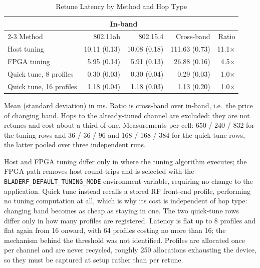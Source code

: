 \begin{table}[!t]
  \renewcommand{\arraystretch}{1.2}
  \caption{Retune Latency by Method and Hop Type}
  \label{tab:retune-latency}
  \centering
  \small
  \begin{tabular}{lrrrr}
    \toprule
    & \multicolumn{2}{c}{In-band} & & \\
    \cmidrule(lr){2-3}
    Method & 802.11ah & 802.15.4 & Cross-band & Ratio \\
    \midrule
    Host tuning            & 10.11 (0.13) & 10.08 (0.18) & 111.63 (0.73) & 11.1$\times$ \\
    FPGA tuning            &  5.95 (0.14) &  5.91 (0.13) &  26.88 (0.16) &  4.5$\times$ \\
    Quick tune, 8 profiles &  0.30 (0.03) &  0.30 (0.04) &   0.29 (0.03) &  1.0$\times$ \\
    Quick tune, 16 profiles &  1.18 (0.04) &  1.18 (0.03) &   1.13 (0.20) &  1.0$\times$ \\
    \bottomrule
  \end{tabular}
  \par\vspace{2pt}
  \parbox{\linewidth}{\footnotesize Mean (standard deviation) in ms. Ratio is
  cross-band over in-band, i.e.\ the price of changing band. Hops to the
  already-tuned channel are excluded: they are not retunes and cost about a
  third of one. Measurements per cell: 650 / 240 / 832 for the tuning rows and
  36 / 36 / 96 and 168 / 168 / 384 for the quick-tune rows, the latter pooled
  over three independent runs.

  Host and FPGA tuning differ only in where the tuning algorithm executes; the
  FPGA path removes host round-trips and is selected with the
  \texttt{BLADERF\_DEFAULT\_TUNING\_MODE} environment variable, requiring no
  change to the application. Quick tune instead recalls a stored RF front-end
  profile, performing no tuning computation at all, which is why its cost is
  independent of hop type: changing band becomes as cheap as staying in one.
  The two quick-tune rows differ only in how many profiles are registered.
  Latency is flat up to 8 profiles and flat again from 16 onward, with 64
  profiles costing no more than 16; the mechanism behind the threshold was not
  identified. Profiles are allocated once per channel and are never recycled,
  roughly 250 allocations exhausting the device, so they must be captured at
  setup rather than per retune.}
\end{table}
